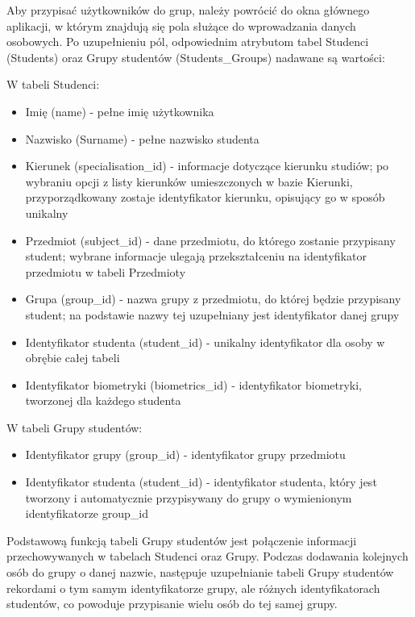 Aby przypisać użytkowników do grup, należy powrócić do okna głównego aplikacji, w którym znajdują się pola służące do wprowadzania danych osobowych. Po uzupełnieniu pól, odpowiednim atrybutom tabel Studenci (Students) oraz Grupy studentów (Students\_Groups) nadawane są wartości:

W tabeli Studenci:
\begin{itemize}
\item Imię (name) - pełne imię użytkownika
\item Nazwisko (Surname) - pełne nazwisko studenta
\item Kierunek (specialisation\_id) - informacje dotyczące kierunku studiów; po wybraniu opcji z listy kierunków umieszczonych w bazie Kierunki, przyporządkowany zostaje identyfikator kierunku, opisujący go w sposób unikalny
\item Przedmiot (subject\_id) - dane przedmiotu, do którego zostanie przypisany student; wybrane informacje ulegają przekształceniu na identyfikator przedmiotu w tabeli Przedmioty
\item Grupa (group\_id) - nazwa grupy z przedmiotu, do której będzie przypisany student; na podstawie nazwy tej uzupełniany jest identyfikator danej grupy
\item Identyfikator studenta (student\_id) - unikalny identyfikator dla osoby w obrębie całej tabeli
\item Identyfikator biometryki (biometrics\_id) - identyfikator biometryki, tworzonej dla każdego studenta
\end{itemize}

W tabeli Grupy studentów:
\begin{itemize}
\item Identyfikator grupy (group\_id) - identyfikator grupy przedmiotu
\item Identyfikator studenta (student\_id) - identyfikator studenta, który jest tworzony i automatycznie przypisywany do grupy o wymienionym identyfikatorze group\_id
\end{itemize}

Podstawową funkcją tabeli Grupy studentów jest połączenie informacji przechowywanych w tabelach Studenci oraz Grupy. Podczas dodawania kolejnych osób do grupy o danej nazwie, następuje uzupełnianie tabeli Grupy studentów rekordami o tym samym identyfikatorze grupy, ale różnych identyfikatorach studentów, co powoduje przypisanie wielu osób do tej samej grupy. 

